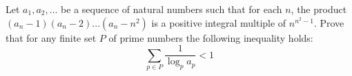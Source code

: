 Let $a_1,a_2,...$ be a sequence of natural numbers such that for each $n$, the product $(a_n - 1)(a_n- 2)...(a_n - n^2)$ is a positive integral multiple of $n^{n^2-1}$. Prove that for any finite set $P$ of prime numbers the following inequality holds:
$$\sum_{p\in P}\frac{1}{\log_p a_p}< 1$$